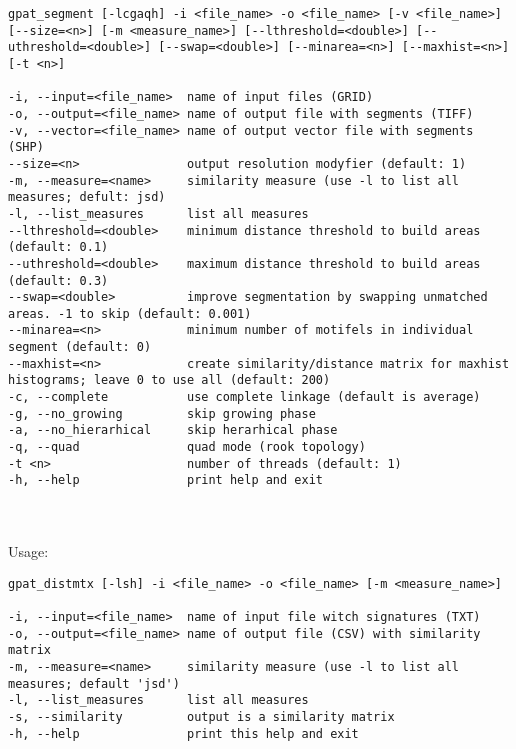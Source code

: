 \begin{minipage}{\linewidth}
\begin{lstlisting}
gpat_segment [-lcgaqh] -i <file_name> -o <file_name> [-v <file_name>] [--size=<n>] [-m <measure_name>] [--lthreshold=<double>] [--uthreshold=<double>] [--swap=<double>] [--minarea=<n>] [--maxhist=<n>] [-t <n>]

-i, --input=<file_name>  name of input files (GRID)
-o, --output=<file_name> name of output file with segments (TIFF)
-v, --vector=<file_name> name of output vector file with segments (SHP)
--size=<n>               output resolution modyfier (default: 1)
-m, --measure=<name>     similarity measure (use -l to list all measures; defult: jsd)
-l, --list_measures      list all measures
--lthreshold=<double>    minimum distance threshold to build areas (default: 0.1)
--uthreshold=<double>    maximum distance threshold to build areas (default: 0.3)
--swap=<double>          improve segmentation by swapping unmatched areas. -1 to skip (default: 0.001)
--minarea=<n>            minimum number of motifels in individual segment (default: 0)
--maxhist=<n>            create similarity/distance matrix for maxhist histograms; leave 0 to use all (default: 200)
-c, --complete           use complete linkage (default is average)
-g, --no_growing         skip growing phase
-a, --no_hierarhical     skip herarhical phase
-q, --quad               quad mode (rook topology)
-t <n>                   number of threads (default: 1)
-h, --help               print help and exit
\end{lstlisting}
\end{minipage}

{}
\\\\
Usage:

\begin{minipage}{\linewidth}
\begin{lstlisting}
gpat_distmtx [-lsh] -i <file_name> -o <file_name> [-m <measure_name>]

-i, --input=<file_name>  name of input file witch signatures (TXT)
-o, --output=<file_name> name of output file (CSV) with similarity matrix
-m, --measure=<name>     similarity measure (use -l to list all measures; default 'jsd')
-l, --list_measures      list all measures
-s, --similarity         output is a similarity matrix
-h, --help               print this help and exit
\end{lstlisting}
\end{minipage}


